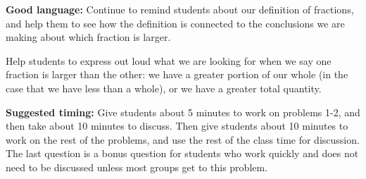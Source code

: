 \documentclass[nooutcomes,noauthor, handout]{ximera}
\begin{document}
\begin{instructorNotes}
{\bf Good language:}  Continue to remind students about our definition of fractions, and help them to see how the definition is connected to the conclusions we are making about which fraction is larger.

Help students to express out loud what we are looking for when we say one fraction is larger than the other: we have a greater portion of our whole (in the case that we have less than a whole), or we have a greater total quantity.



{\bf Suggested timing:} Give students about 5 minutes to work on problems 1-2, and then take about 10 minutes to discuss. Then give students about 10 minutes to work on the rest of the problems, and use the rest of the class time for discussion. The last question is a bonus question for students who work quickly and does not need to be discussed unless most groups get to this problem.




\end{instructorNotes}
\end{document}
